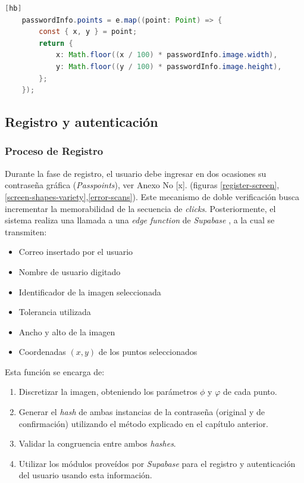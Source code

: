 \begin{lstlisting}[style=mystyle, language=Java, caption=C\'odigo de transformaci\'on en coordenadas de imagen, label=point-capture2][hb]
	passwordInfo.points = e.map((point: Point) => {
		const { x, y } = point;
		return {
			x: Math.floor((x / 100) * passwordInfo.image.width),
			y: Math.floor((y / 100) * passwordInfo.image.height),
		};
	});
\end{lstlisting}

\subsection{Registro y autenticaci\'on}
\subsubsection{Proceso de Registro}
Durante la fase de registro, el usuario debe ingresar en dos ocasiones su contraseña gráfica (\textit{Passpoints}), ver Anexo No [x]. (figuras \ref{register-screen},  \ref{screen-shapes-variety},\ref{error-scans}). Este mecanismo de doble verificación busca incrementar la memorabilidad de la secuencia de \textit{clicks}. Posteriormente, el sistema realiza una llamada a una \textit{edge function} de \textit{Supabase} , a la cual se transmiten:

\begin{itemize}
	\item Correo insertado por el usuario
	\item Nombre de usuario digitado
	\item Identificador de la imagen seleccionada
	\item Tolerancia utilizada 
	\item Ancho y alto de la imagen
	\item Coordenadas $(x,y)$ de los puntos seleccionados
\end{itemize}

Esta función se encarga de: 
\begin{enumerate}
	\item Discretizar la imagen, obteniendo los parámetros $\phi$  y $\varphi$ de cada punto.
	\item Generar el \textit{hash} de ambas instancias de la contraseña (original y de confirmación) utilizando el m\'etodo explicado en el cap\'itulo anterior.
	\item Validar la congruencia entre ambos \textit{hashes}.
	\item Utilizar los m\'odulos prove\'idos por \textit{Supabase}  para el registro y autenticaci\'on del usuario usando esta informaci\'on.
\end{enumerate}

